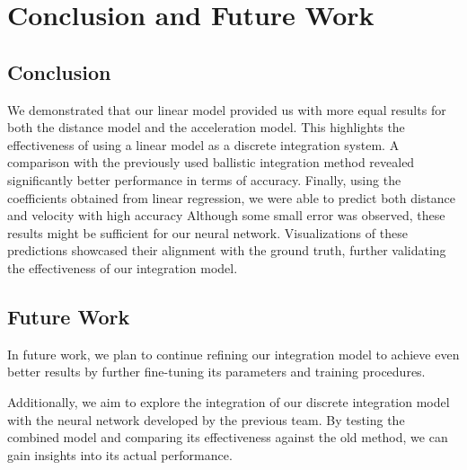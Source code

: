 \section{Conclusion and Future Work}

\subsection{Conclusion}
We demonstrated that our linear model provided us with more equal results for both the distance model and 
the acceleration model.
This highlights the effectiveness of using a linear model as a discrete integration system.
A comparison with the previously used ballistic integration method revealed significantly better performance in terms of accuracy.
Finally, using the coefficients obtained from linear regression, 
we were able to predict both distance and velocity with high accuracy
Although some small error was observed, these results might be sufficient for our neural network.
Visualizations of these predictions showcased their alignment with the ground truth, further validating the effectiveness of our integration model.

\subsection{Future Work}
In future work, we plan to continue refining our integration model to achieve even better results by further fine-tuning its parameters and training procedures. 

Additionally, we aim to explore the integration of our discrete integration model with the neural network developed by the previous team.
By testing the combined model and comparing its effectiveness against the old method, we can gain insights into its actual performance. 